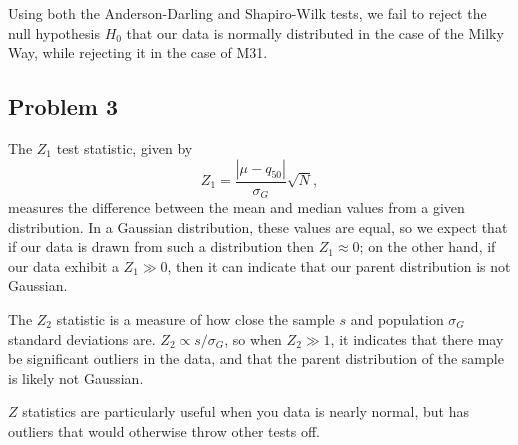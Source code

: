 \documentclass[11pt]{article}
\begin{document}
    Using both the Anderson-Darling and Shapiro-Wilk tests, we fail to
reject the null hypothesis \(H_0\) that our data is normally distributed
in the case of the Milky Way, while rejecting it in the case of M31.

    \hypertarget{problem-3}{%
\subsection{Problem 3}\label{problem-3}}

    The \(Z_1\) test statistic, given by
\[ Z_1 = \frac{|\mu-q_{50}|}{\sigma_G}\sqrt{N}, \] measures the
difference between the mean and median values from a given distribution.
In a Gaussian distribution, these values are equal, so we expect that if
our data is drawn from such a distribution then \(Z_1 \approx 0\); on
the other hand, if our data exhibit a \(Z_1 \gg 0\), then it can
indicate that our parent distribution is not Gaussian.

The \(Z_2\) statistic is a measure of how close the sample \(s\) and
population \(\sigma_G\) standard deviations are.
\(Z_2 \propto s/\sigma_G\), so when \(Z_2 \gg 1\), it indicates that
there may be significant outliers in the data, and that the parent
distribution of the sample is likely not Gaussian.

\(Z\) statistics are particularly useful when you data is nearly normal,
but has outliers that would otherwise throw other tests off.
\end{document}
